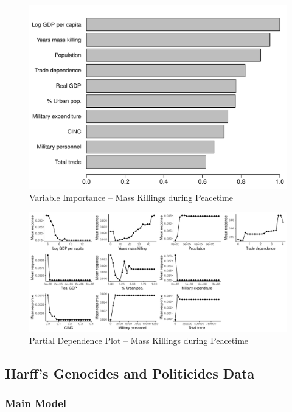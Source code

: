 \begin{figure}[H]
    \centering
    \includegraphics[width=.85\textwidth]{images/rf-nowar.pdf}
    \caption{Variable Importance -- Mass Killings during Peacetime}
    \label{fig:rf-mk-4363}
\end{figure}

\newpage

\clearpage
\begin{figure}
    \centering
    \includegraphics[width=\textwidth]{images/rf-nowar-pd.pdf}
    \caption{Partial Dependence Plot -- Mass Killings during Peacetime}
    \label{fig:rf-mk-4363}
\end{figure}
\clearpage


\newpage

\subsection{Harff's Genocides and Politicides Data}

\subsubsection{Main Model}

